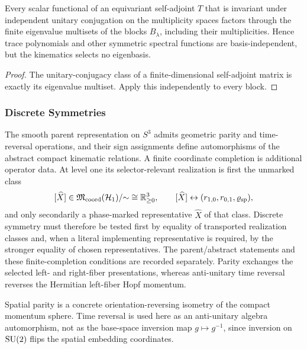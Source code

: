 \documentclass[12pt,a4paper]{article}
\begin{document}
\begin{corollary}
\label{p2d:cor:schur-scalar-functionals}
Every scalar functional of an equivariant self-adjoint \(T\) that is invariant
under independent unitary conjugation on the multiplicity spaces factors
through the finite eigenvalue multisets of the blocks \(B_\lambda\), including
their multiplicities.  Hence trace polynomials and other symmetric spectral
functions are basis-independent, but the kinematics selects no eigenbasis.
\end{corollary}

\begin{proof}
The unitary-conjugacy class of a finite-dimensional self-adjoint matrix is
exactly its eigenvalue multiset.  Apply this independently to every block.
\end{proof}


\subsubsection{Discrete Symmetries}
\label{p2:sec:discrete-symmetries}

The smooth parent representation on \(S^3\) admits geometric parity and
time-reversal operations, and their sign assignments define automorphisms of
the abstract compact kinematic relations.  A finite coordinate completion is
additional operator data.  At level one its selector-relevant realization is
first the unmarked class
\[
 [\widehat X]\in
 \mathfrak M_{\rm coord}(\mathcal H_1)/{\sim}
 \cong\mathbb R_{\ge0}^{3},
 \qquad
 [\widehat X]\leftrightarrow
 (r_{1,0},r_{0,1},\varrho_{\rm sp}),
\]
and only secondarily a phase-marked representative \(\widehat X\) of that
class.  Discrete symmetry must therefore be tested first by equality of
transported realization classes and, when a literal implementing
representative is required, by the stronger equality of chosen
representatives.  The parent/abstract statements and these finite-completion
conditions are recorded separately.  Parity exchanges the selected left- and
right-fiber presentations, whereas anti-unitary time reversal reverses the
Hermitian left-fiber Hopf momentum.

Spatial parity is a concrete orientation-reversing isometry of the compact
momentum sphere.  Time reversal is used here as an anti-unitary algebra
automorphism, not as the base-space inversion map \(g\mapsto g^{-1}\), since
inversion on \(\mathrm{SU}(2)\) flips the spatial embedding coordinates.
\end{document}
